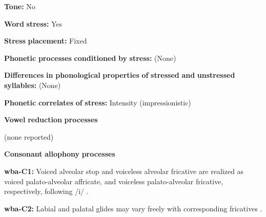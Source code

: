 \begin{styleBody}
\textbf{Tone:} No
\end{styleBody}

\begin{styleBody}
\textbf{Word} \textbf{stress:} Yes
\end{styleBody}

\begin{styleBody}
\textbf{Stress} \textbf{placement:} Fixed
\end{styleBody}

\begin{styleBody}
\textbf{Phonetic} \textbf{processes} \textbf{conditioned} \textbf{by} \textbf{stress:} (None)
\end{styleBody}

\begin{styleBody}
\textbf{Differences} \textbf{in} \textbf{phonological} \textbf{properties} \textbf{of} \textbf{stressed} \textbf{and} \textbf{unstressed} \textbf{syllables:} (None)
\end{styleBody}

\begin{styleBody}
\textbf{Phonetic} \textbf{correlates} \textbf{of} \textbf{stress:} Intensity (impressionistic)
\end{styleBody}

\begin{styleBody}
\textbf{Vowel} \textbf{reduction} \textbf{processes}
\end{styleBody}

\begin{styleBody}
(none reported)
\end{styleBody}

\begin{styleBody}
\textbf{Consonant} \textbf{allophony} \textbf{processes}
\end{styleBody}

\begin{styleBody}
\textbf{wba-C1:} Voiced alveolar stop and voiceless alveolar fricative are realized as voiced palato-alveolar affricate, and voiceless palato-alveolar fricative, respectively, following /i/ \citep[121]{Arinterol2000}.
\end{styleBody}

\begin{styleBody}
\textbf{wba-C2:} Labial and palatal glides may vary freely with corresponding fricatives \citep[122]{Arinterol2000}.
\end{styleBody}

